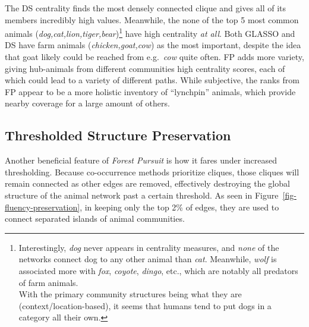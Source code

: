 \documentclass[%
	12pt,
		oneside,
		letterpaper
]{book}
\begin{document}
The DS centrality finds the most densely connected clique and gives all
of its members incredibly high values. Meanwhile, the none of the top 5
most common animals (\emph{dog,cat,lion,tiger,bear})\footnote{Interestingly,
  \emph{dog} never appears in centrality measures, and \emph{none} of
  the networks connect dog to any other animal than \emph{cat}.
  Meanwhile, \emph{wolf} is associated more with \emph{fox},
  \emph{coyote}, \emph{dingo}, etc., which are notably all predators of
  farm animals.\\
  With the primary community structures being what they are
  (context/location-based), it seems that humans tend to put dogs in a
  category all their own.} have high centrality \emph{at all}. Both
GLASSO and DS have farm animals (\emph{chicken,goat,cow}) as the most
important, despite the idea that goat likely could be reached from
e.g.~\emph{cow} quite often. FP adds more variety, giving hub-animals
from different communities high centrality scores, each of which could
lead to a variety of different paths. While subjective, the ranks from
FP appear to be a more holistic inventory of ``lynchpin'' animals, which
provide nearby coverage for a large amount of others.

\subsection{Thresholded Structure
Preservation}\label{thresholded-structure-preservation}

Another beneficial feature of \emph{Forest Pursuit} is how it fares
under increased thresholding. Because co-occurrence methods prioritize
cliques, those cliques will remain connected as other edges are removed,
effectively destroying the global structure of the animal network past a
certain threshold. As seen in Figure~\ref{fig-fluency-preservation}, in
keeping only the top 2\% of edges, they are used to connect separated
islands of animal communities.
\end{document}
